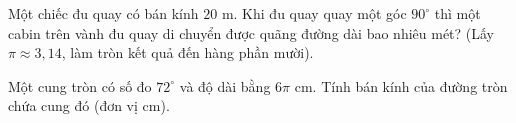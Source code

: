 \begin{bt}%
	Một chiếc đu quay có bán kính $20\text{ m}$. Khi đu quay quay một góc $90^\circ$ thì một cabin trên vành đu quay di chuyển được quãng đường dài bao nhiêu mét? (Lấy $\pi \approx 3{,}14$, làm tròn kết quả đến hàng phần mười).
\end{bt}

\begin{bt}%
	Một cung tròn có số đo $72^\circ$ và độ dài bằng $6\pi\text{ cm}$. Tính bán kính của đường tròn chứa cung đó (đơn vị cm).
\end{bt}

